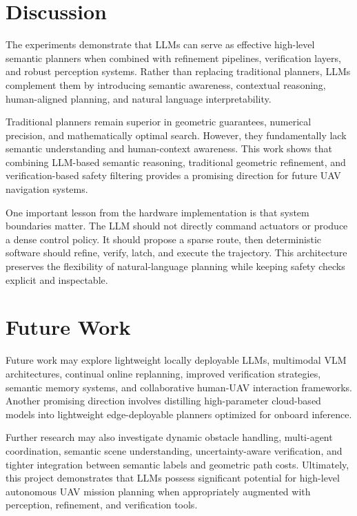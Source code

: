 \documentclass[11pt]{article}
\begin{document}
\section{Discussion}

The experiments demonstrate that LLMs can serve as effective high-level semantic planners when combined with refinement pipelines, verification layers, and robust perception systems. Rather than replacing traditional planners, LLMs complement them by introducing semantic awareness, contextual reasoning, human-aligned planning, and natural language interpretability.

Traditional planners remain superior in geometric guarantees, numerical precision, and mathematically optimal search. However, they fundamentally lack semantic understanding and human-context awareness. This work shows that combining LLM-based semantic reasoning, traditional geometric refinement, and verification-based safety filtering provides a promising direction for future UAV navigation systems.

One important lesson from the hardware implementation is that system boundaries matter. The LLM should not directly command actuators or produce a dense control policy. It should propose a sparse route, then deterministic software should refine, verify, latch, and execute the trajectory. This architecture preserves the flexibility of natural-language planning while keeping safety checks explicit and inspectable.

\section{Future Work}

Future work may explore lightweight locally deployable LLMs, multimodal VLM architectures, continual online replanning, improved verification strategies, semantic memory systems, and collaborative human-UAV interaction frameworks. Another promising direction involves distilling high-parameter cloud-based models into lightweight edge-deployable planners optimized for onboard inference.

Further research may also investigate dynamic obstacle handling, multi-agent coordination, semantic scene understanding, uncertainty-aware verification, and tighter integration between semantic labels and geometric path costs. Ultimately, this project demonstrates that LLMs possess significant potential for high-level autonomous UAV mission planning when appropriately augmented with perception, refinement, and verification tools.
\end{document}

